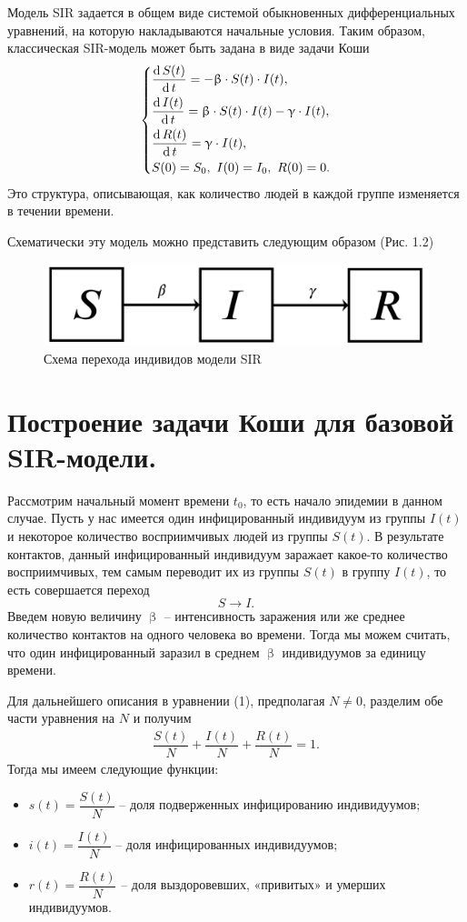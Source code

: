 \documentclass[a4paper, 14pt]{extreport}
\numberwithin{equation}{section}
\renewcommand{\beta}{\upbeta}
\renewcommand{\gamma}{\upgamma}
\renewcommand{\d}{\operatorname{d}}
\begin{document}
	Модель SIR задается в общем виде системой обыкновенных дифференциальных уравнений, на которую накладываются начальные условия. Таким образом, классическая SIR-модель может быть задана в виде задачи Коши
	\begin{equation}
		\begin{dcases}
			\dfrac {\d S(t)}{\d t} = -\beta \cdot S(t) \cdot I(t),\\
			\dfrac{\d I(t)}{\d t} = \beta \cdot S(t)\cdot I(t) - \gamma\cdot I(t),\\
			\dfrac{\d R(t)}{\d t} = \gamma\cdot I(t), \\
			S(0) = S_0,\ I(0) = I_0,\ R(0) = 0.
		\end{dcases}
	\end{equation}
	Это структура, описывающая, как количество людей в каждой группе изменяется в течении времени. 
	
	Схематически эту модель можно представить следующим образом (Рис. 1.2)
	\begin{figure}[h]
		\centering
		\includegraphics[scale=0.25]{images/img06}
		\caption{Схема перехода индивидов модели SIR}
		\label{fig:img06}
	\end{figure}
	
	\section{Построение задачи Коши для базовой SIR-модели.}
	Рассмотрим начальный момент времени $t_0$, то есть начало эпидемии в данном случае. Пусть у нас имеется один инфицированный индивидуум из группы $I(t)$ и некоторое количество восприимчивых людей из группы $S(t)$. В результате контактов, данный инфицированный индивидуум заражает какое-то количество восприимчивых, тем самым переводит их из группы $S(t)$ в группу $I(t)$, то есть совершается переход $$S \to I.$$
	Введем новую величину $\beta$ -- интенсивность заражения или же  среднее количество контактов на одного человека во времени. Тогда мы можем считать, что один инфицированный заразил в среднем $\beta$ индивидуумов за единицу времени.
	
	Для дальнейшего описания в уравнении (1), предполагая $N\ne 0$, разделим обе части уравнения на $N$ и получим 
	\begin{eqnarray}
		\dfrac{S(t)}{N} + \dfrac{I(t)}{N} + \dfrac{R(t)}N = 1.
	\end{eqnarray}
	Тогда мы имеем следующие функции:
	\begin{itemize}
		\item $s(t) = \dfrac {S(t)} N$ -- доля подверженных инфицированию индивидуумов;
		\item $i(t) = \dfrac{I(t)} N$ -- доля инфицированных индивидуумов;
		\item $r(t) = \dfrac{R(t)} N$ -- доля выздоровевших, «привитых» и умерших индивидуумов.
	\end{itemize}
	
\end{document}
